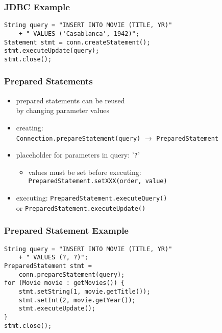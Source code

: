 \documentclass[dvipsnames]{beamer}
\theoremstyle{plain}
\begin{document}
\begin{frame}[fragile]
  \frametitle{JDBC Example}

  \begin{example}[inserting]
    \begin{lstlisting}
String query = "INSERT INTO MOVIE (TITLE, YR)"
    + " VALUES ('Casablanca', 1942)";
Statement stmt = conn.createStatement();
stmt.executeUpdate(query);
stmt.close();
    \end{lstlisting}
  \end{example}
\end{frame}

\begin{frame}
  \frametitle{Prepared Statements}

  \begin{itemize}
    \item prepared statements can be reused\\
      by changing parameter values

    \pause
    \medskip
    \item creating:\\
      \lstinline!Connection.prepareStatement(query)!
      $\rightarrow$ \lstinline!PreparedStatement!
    \item placeholder for parameters in query: '\lstinline!?!'
    \begin{itemize}
      \item values must be set before executing:\\
	\lstinline!PreparedStatement.setXXX(order, value)!
    \end{itemize}

    \pause
    \medskip
    \item executing: \lstinline!PreparedStatement.executeQuery()!\\
      or \lstinline!PreparedStatement.executeUpdate()!
  \end{itemize}
\end{frame}

\begin{frame}[fragile]
  \frametitle{Prepared Statement Example}

  \begin{example}
    \begin{lstlisting}
String query = "INSERT INTO MOVIE (TITLE, YR)"
    + " VALUES (?, ?)";
PreparedStatement stmt =
    conn.prepareStatement(query);
for (Movie movie : getMovies()) {
    stmt.setString(1, movie.getTitle());
    stmt.setInt(2, movie.getYear());
    stmt.executeUpdate();
}
stmt.close();
    \end{lstlisting}
  \end{example}
\end{frame}
\end{document}
